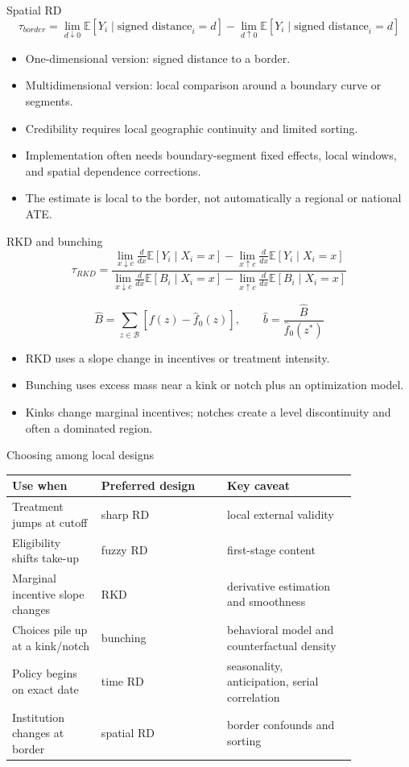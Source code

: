 \documentclass[aspectratio=169,11pt]{beamer}
\newcommand{\E}{\mathbb{E}}
\newcommand{\1}{\mathbf{1}}
\begin{document}
\begin{frame}{Spatial RD}
\[
\tau_{border}
=
\lim_{d\downarrow 0}\E[Y_i\mid \text{signed distance}_i=d]
-
\lim_{d\uparrow 0}\E[Y_i\mid \text{signed distance}_i=d]
\]

\begin{itemize}
    \item One-dimensional version: signed distance to a border.
    \item Multidimensional version: local comparison around a boundary curve or segments.
    \item Credibility requires local geographic continuity and limited sorting.
    \item Implementation often needs boundary-segment fixed effects, local windows, and spatial dependence corrections.
    \item The estimate is local to the border, not automatically a regional or national ATE.
\end{itemize}
\end{frame}

\begin{frame}{RKD and bunching}
\small
\[
\tau_{RKD}
=
\frac{
\lim_{x\downarrow c}\frac{d}{dx}\E[Y_i\mid X_i=x]
-
\lim_{x\uparrow c}\frac{d}{dx}\E[Y_i\mid X_i=x]
}{
\lim_{x\downarrow c}\frac{d}{dx}\E[B_i\mid X_i=x]
-
\lim_{x\uparrow c}\frac{d}{dx}\E[B_i\mid X_i=x]
}
\]

\[
\widehat B=\sum_{z\in \mathcal B}\left[f(z)-\widehat f_0(z)\right],
\qquad
\widehat b=\frac{\widehat B}{\widehat f_0(z^*)}
\]

\begin{itemize}
    \item RKD uses a slope change in incentives or treatment intensity.
    \item Bunching uses excess mass near a kink or notch plus an optimization model.
    \item Kinks change marginal incentives; notches create a level discontinuity and often a dominated region.
\end{itemize}
\end{frame}

\begin{frame}{Choosing among local designs}
\small
\begin{tabular}{p{0.22\linewidth} p{0.31\linewidth} p{0.32\linewidth}}
\toprule
Use when & Preferred design & Key caveat \\
\midrule
Treatment jumps at cutoff & sharp RD & local external validity \\
Eligibility shifts take-up & fuzzy RD & first-stage content \\
Marginal incentive slope changes & RKD & derivative estimation and smoothness \\
Choices pile up at a kink/notch & bunching & behavioral model and counterfactual density \\
Policy begins on exact date & time RD & seasonality, anticipation, serial correlation \\
Institution changes at border & spatial RD & border confounds and sorting \\
\bottomrule
\end{tabular}
\end{frame}
\end{document}
